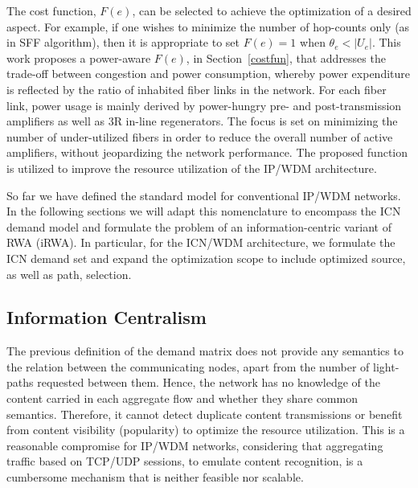 \documentclass[journal]{IEEEtran}
\begin{document}
The cost function, $F(e)$, can be selected to achieve the optimization of a desired aspect. For example, if one wishes to minimize the number of hop-counts only
(as in SFF algorithm), then it is appropriate to set $F(e) = 1 $ when
$ \theta_e < |U_e| $. 
This work proposes a power-aware $F(e)$, in Section~\ref{costfun},
that addresses the trade-off between congestion and power consumption,
whereby power expenditure is reflected by the ratio of inhabited fiber
links in the network. For each fiber link, power usage is mainly
derived by power-hungry pre- and post-transmission amplifiers as well
as 3R in-line regenerators. The focus is set on minimizing the number
of under-utilized fibers in order to reduce the overall number of
active amplifiers, without jeopardizing the network performance. The
proposed function is utilized to improve the resource utilization of
the IP/WDM architecture.

So far we have defined the standard model for conventional IP/WDM
networks. In the following sections we will adapt this nomenclature to
encompass the ICN demand model and formulate the problem of
an information-centric variant of RWA (iRWA). In particular, for the
ICN/WDM architecture, we formulate the ICN demand set and expand the
optimization scope to include optimized source, as well as path,
selection.

\subsection{Information Centralism}\label{sec:icndefs}
The previous definition of the demand matrix does not provide any semantics to the relation between the communicating nodes, apart from the number of light-paths requested between them. Hence, the network has no knowledge of the content carried in each aggregate flow and whether they share common semantics. Therefore, it cannot detect duplicate content transmissions or benefit from content visibility (popularity) to optimize the resource utilization.
This is a reasonable compromise for IP/WDM networks, considering that aggregating traffic based on TCP/UDP sessions, to emulate content recognition, is a cumbersome mechanism that is neither feasible nor scalable.
\end{document}

